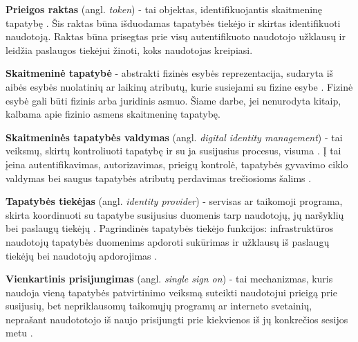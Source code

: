\textbf{Prieigos raktas} (angl. \textit{token}) - tai objektas, identifikuojantis skaitmeninę tapatybę \cite{TokenDefinition}.
Šis raktas būna išduodamas tapatybės tiekėjo ir skirtas identifikuoti naudotoją. Raktas
būna prisegtas prie visų autentifikuoto naudotojo užklausų ir leidžia paslaugos tiekėjui žinoti, koks naudotojas kreipiasi.

\textbf{Skaitmeninė tapatybė} - abstrakti fizinės esybės reprezentacija, sudaryta iš aibės esybės nuolatinių ar laikinų atributų,
kurie susiejami su fizine esybe \cite{Glasser2009, Camp2004}. Fizinė esybė gali būti fizinis arba juridinis asmuo.
Šiame darbe, jei nenurodyta kitaip, kalbama apie fizinio asmens skaitmeninę tapatybę.

\textbf{Skaitmeninės tapatybės valdymas} (angl. \textit{digital identity management}) - tai veiksmų, skirtų kontroliuoti
tapatybę ir su ja susijusius procesus, visuma \cite{Dabrowski2008}. Į tai įeina autentifikavimas, autorizavimas,
prieigų kontrolė, tapatybės gyvavimo ciklo
valdymas bei saugus tapatybės atributų perdavimas trečiosioms šalims \cite{Cao2010}.

\textbf{Tapatybės tiekėjas} (angl. \textit{identity provider}) - servisas ar taikomoji programa, skirta koordinuoti su tapatybe
susijusius duomenis tarp naudotojų, jų naršyklių bei paslaugų tiekėjų \cite{Strictest2011}. Pagrindinės tapatybės tiekėjo funkcijos:
infrastruktūros naudotojų tapatybės duomenims apdoroti sukūrimas ir užklausų iš paslaugų tiekėjų bei naudotojų apdorojimas \cite{Cao2010}.

\textbf{Vienkartinis prisijungimas} (angl. \textit{single sign on}) - tai mechanizmas, kuris naudoja vieną tapatybės patvirtinimo veiksmą suteikti naudotojui prieigą
prie susijusių, bet nepriklausomų taikomųjų programų ar interneto svetainių, neprašant naudototojo
iš naujo prisijungti prie kiekvienos iš jų konkrečios sesijos metu \cite{Radha2012}.